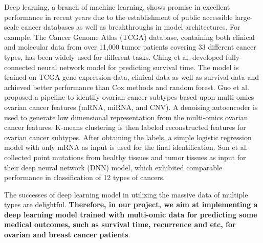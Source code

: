 \documentclass{article}
\begin{document}
Deep learning, a branch of machine learning, shows promise in excellent performance in recent years due to the establishment of public accessible large-scale cancer databases as well as breakthroughs in model architectures\cite{zhu2020application}. For example, The Cancer Genome Atlas (TCGA) database, containing both clinical and molecular data from over 11,000 tumor patients covering 33 different cancer types, has been widely used for different tasks\cite{tomczak2015cancer}. Ching et al.\cite{ching2018cox} developed fully-connected neural network model for predicting survival time. The model is trained on TCGA gene expression data, clinical data as well as survival data and achieved better performance than Cox methods and random forest. Guo et al.\cite{guo2020deep} proposed a pipeline to identify ovarian cancer subtypes based upon multi-omics ovarian cancer features (mRNA, miRNA, and CNV). A denoising autoencoder is used to generate low dimensional representation from the multi-omics ovarian cancer features. K-means clustering is then labeled reconstructed features for ovarian cancer subtypes. After obtaining the labels, a simple logistic regression model with only mRNA as input is used for the final identification. Sun et al.\cite{sun2019identification} collected point mutations from healthy tissues and tumor tissues as input for their deep neural network (DNN) model, which exhibited comparable performance in classification of 12 types of cancers.

The successes of deep learning model in utilizing the massive data of multiple types are delightful. \textbf{Therefore, in our project, we aim at implementing a deep learning model trained with multi-omic data for predicting some medical outcomes, such as survival time, recurrence and etc, for ovarian and breast cancer patients}. 




\end{document}
